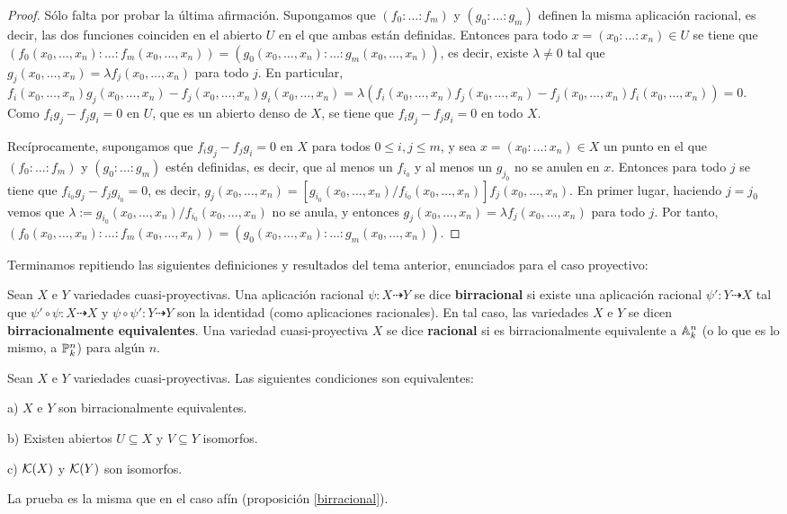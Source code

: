 \documentclass[ACGA.tex]{subfiles}
\begin{document}
\begin{proof}
 Sólo falta por probar la última afirmación. Supongamos que $(f_0:\ldots:f_m)$ y $(g_0:\ldots:g_m)$ definen la misma aplicación racional, es decir, las dos funciones coinciden en el abierto $U$ en el que ambas están definidas. Entonces para todo $x=(x_0:\ldots:x_n)\in U$ se tiene que $(f_0(x_0,\ldots,x_n):\ldots:f_m(x_0,\ldots,x_n))=(g_0(x_0,\ldots,x_n):\ldots:g_m(x_0,\ldots,x_n))$, es decir, existe $\lambda\neq 0$ tal que $g_j(x_0,\ldots,x_n)=\lambda f_j(x_0,\ldots,x_n)$ para todo $j$. En particular, $f_i(x_0,\ldots,x_n)g_j(x_0,\ldots,x_n)-f_j(x_0,\ldots,x_n)g_i(x_0,\ldots,x_n)=\lambda(f_i(x_0,\ldots,x_n)f_j(x_0,\ldots,x_n)-f_j(x_0,\ldots,x_n)f_i(x_0,\ldots,x_n))=0$. Como $f_ig_j-f_jg_i=0$ en $U$, que es un abierto denso de $X$, se tiene que $f_ig_j-f_jg_i=0$ en todo $X$.
 
Recíprocamente, supongamos que $f_ig_j-f_jg_i=0$ en $X$ para todos $0\leq i,j\leq m$, y sea $x=(x_0:\ldots:x_n)\in X$ un punto en el que $(f_0:\ldots:f_m)$ y $(g_0:\ldots:g_m)$ estén definidas, es decir, que al menos un $f_{i_0}$ y al menos un $g_{j_0}$ no se anulen en $x$. Entonces para todo $j$ se tiene que $f_{i_0}g_j-f_jg_{i_0}=0$, es decir, $g_j(x_0,\ldots,x_n)=[g_{i_0}(x_0,\ldots,x_n)/f_{i_0}(x_0,\ldots,x_n)]f_j(x_0,\ldots,x_n)$. En primer lugar, haciendo $j=j_0$ vemos que $\lambda:=g_{i_0}(x_0,\ldots,x_n)/f_{i_0}(x_0,\ldots,x_n)$ no se anula, y entonces $g_j(x_0,\ldots,x_n)=\lambda f_j(x_0,\ldots,x_n)$ para todo $j$. Por tanto, $(f_0(x_0,\ldots,x_n):\ldots:f_m(x_0,\ldots,x_n))=(g_0(x_0,\ldots,x_n):\ldots:g_m(x_0,\ldots,x_n))$.
\end{proof}

Terminamos repitiendo las siguientes definiciones y resultados del tema anterior, enunciados para el caso proyectivo:

\begin{defi}
 Sean $X$ e $Y$ variedades cuasi-proyectivas. Una aplicación racional $\psi:X\dashrightarrow Y$ se dice {\bf birracional} si existe una aplicación racional $\psi':Y\dashrightarrow X$ tal que $\psi'\circ\psi:X\dashrightarrow X$ y $\psi\circ\psi':Y\dashrightarrow Y$ son la identidad (como aplicaciones racionales). En tal caso, las variedades $X$ e $Y$ se dicen {\bf birracionalmente equivalentes}. Una variedad cuasi-proyectiva $X$ se dice {\bf racional} si es birracionalmente equivalente a $\mathbb{A}^n_k$ (o lo que es lo mismo, a $\mathbb{P}^n_k$) para algún $n$.
\end{defi}

\begin{prop}\label{birracproy}
 Sean $X$ e $Y$ variedades cuasi-proyectivas. Las siguientes condiciones son equivalentes:

a) $X$ e $Y$ son birracionalmente equivalentes.

b) Existen abiertos $U\subseteq X$ y $V\subseteq Y$ isomorfos.

c) ${\mathcal K}(X)$ y ${\mathcal K}(Y)$ son isomorfos. 

\end{prop}

La prueba es la misma que en el caso afín (proposición \ref{birracional}).
\end{document}
